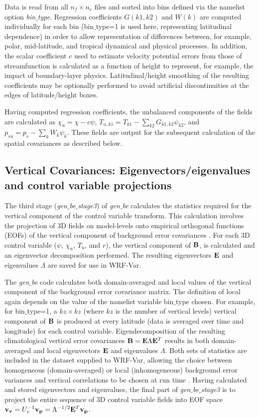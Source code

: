 Data is read from all $n_f \times n_e$ files and sorted into bins defined via the namelist 
option {\it bin$\_$type}. Regression coefficients $G(k1,k2)$ and $W(k)$ are computed 
individually for each bin (bin$\_$type=1 is used here, representing latitudinal dependence) 
in order to allow representation of differences between, for example, polar, mid-latitude, and 
tropical dynamical and physical processes. In addition, the scalar coefficient $c$ used to 
estimate velocity potential errors from those of streamfunction is calculated as a function 
of height to represent, for example, the impact of boundary-layer physics. Latitudinal/height 
smoothing of the resulting coefficients may be optionally performed to avoid artificial 
discontinuities at the edges of latitude/height boxes.

Having computed regression coefficients, the unbalanced components of the fields are 
calculated as $\chi_u=\chi-c\psi$, $T_{u,k1}=T_{k1}-\sum_{k2}G_{k1,k2}\psi_{k2}$, 
and $p_{su}=p_s - \sum_{k} W_{k}\psi_{k}$. These fields are output for the 
subsequent calculation of the spatial covariances as described below.

\subsection{Vertical Covariances: Eigenvectors/eigenvalues and 
control variable projections}

The third stage ({\it gen$\_$be$\_$stage3}) of {\it gen$\_$be}
calculates the statistics required for the vertical component of the
control variable transform. This calculation involves the projection
of 3D fields on model-levels onto empirical orthogonal functions
(EOFs) of the vertical component of background error covariances
\citep{barker04}. For each 3D control variable ($\psi$, $\chi_u$,
$T_u$, and $r$), the vertical component of ${\bf B}$, is calculated
and an eigenvector decomposition performed. The resulting eigenvectors
${\bf E}$ and eigenvalues $\Lambda$ are saved for use in WRF-Var.

The {\it gen$\_$be} code calculates both domain-averaged and local
values of the vertical component of the background error covariance
matrix. The definition of local again depends on the value of the
namelist variable bin$\_$type chosen. For example, for bin$\_$type=1,
a $kz \times kz$ (where $kz$ is the number of vertical levels) vertical
component of $\bf B$ is produced at every latitude (data is averaged
over time and longitude) for each control variable. Eigendecomposition
of the resulting climatological vertical error covariances ${\bf
B}={\bf E}{\Lambda}{\bf E}^{T}$ results in both domain-averaged and
local eigenvectors $\bf E$ and eigenvalues $\Lambda$. Both sets of
statistics are included in the dataset supplied to WRF-Var, allowing
the choice between homogeneous (domain-averaged) or local
(inhomogeneous) background error variances and vertical correlations
to be chosen at run time \citep{barker04}.
Having calculated and stored eigenvectors and eigenvalues, the final
part of {\it gen$\_$be$\_$stage3} is to project the entire sequence of
3D control variable fields into EOF space ${\bf v_v}=U_{v}^{-1}{\bf
v_p}=\Lambda^{-1/2}{\bf E}^{T} {\bf v_p}$.

